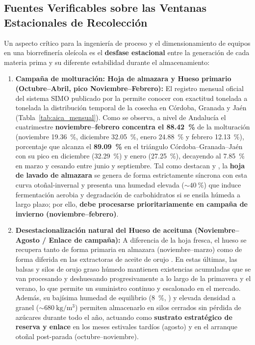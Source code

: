 \documentclass{report}
\begin{document}
\subsection{Fuentes Verificables sobre las Ventanas Estacionales de Recolección}
Un aspecto crítico para la ingeniería de proceso y el dimensionamiento de equipos en una biorrefinería oleícola es el \textbf{desfase estacional} entre la generación de cada materia prima y su diferente estabilidad durante el almacenamiento:
\begin{enumerate}
    \item \textbf{Campaña de molturación: Hoja de almazara y Hueso primario (Octubre--Abril, pico Noviembre--Febrero):} El registro mensual oficial del sistema SIMO publicado por la \textcite{AICA2026} permite conocer con exactitud tonelada a tonelada la distribución temporal de la cosecha en Córdoba, Granada y Jaén (Tabla~\ref{tab:aica_mensual}). Como se observa, a nivel de Andalucía el cuatrimestre \textbf{noviembre--febrero concentra el \SI{88.42}{\percent}} de la molturación (noviembre \SI{19.36}{\percent}, diciembre \SI{32.05}{\percent}, enero \SI{24.88}{\percent} y febrero \SI{12.13}{\percent}), porcentaje que alcanza el \textbf{\SI{89.09}{\percent}} en el triángulo Córdoba--Granada--Jaén con su pico en diciembre (\SI{32.29}{\percent}) y enero (\SI{27.25}{\percent}), decayendo al \SI{7.85}{\percent} en marzo y cesando entre junio y septiembre. Tal como destacan \textcite[Sección~2.1.1]{Jafari-Gohargan2026} y \textcite{Manzanares2017}, la \textbf{hoja de lavado de almazara} se genera de forma estrictamente síncrona con esta curva otoñal-invernal y presenta una humedad elevada ($\sim \SI{40}{\percent}$) que induce fermentación aerobia y degradación de carbohidratos si se ensila húmeda a largo plazo; por ello, \textbf{debe procesarse prioritariamente en campaña de invierno (noviembre--febrero)}.
    \item \textbf{Desestacionalización natural del Hueso de aceituna (Noviembre--Agosto / Enlace de campaña):} A diferencia de la hoja fresca, el hueso se recupera tanto de forma primaria en almazara (noviembre--marzo) como de forma diferida en las extractoras de aceite de orujo \autocite{ElFessikh2025, AICA2026}. En estas últimas, las balsas y silos de orujo graso húmedo mantienen existencias acumuladas que se van procesando y deshuesando progresivamente a lo largo de la primavera y el verano, lo que permite un suministro continuo y escalonado en el mercado. Además, su bajísima humedad de equilibrio (\SI{8}{\percent}, \textcite{RomeroGarcia2022}) y elevada densidad a granel ($\sim \SI{680}{\kilo\gram/\cubic\meter}$) permiten almacenarlo en silos cerrados sin pérdida de azúcares durante todo el año, actuando como \textbf{sustrato estratégico de reserva y enlace} en los meses estivales tardíos (agosto) y en el arranque otoñal post-parada (octubre--noviembre).

\end{enumerate}
\end{document}
